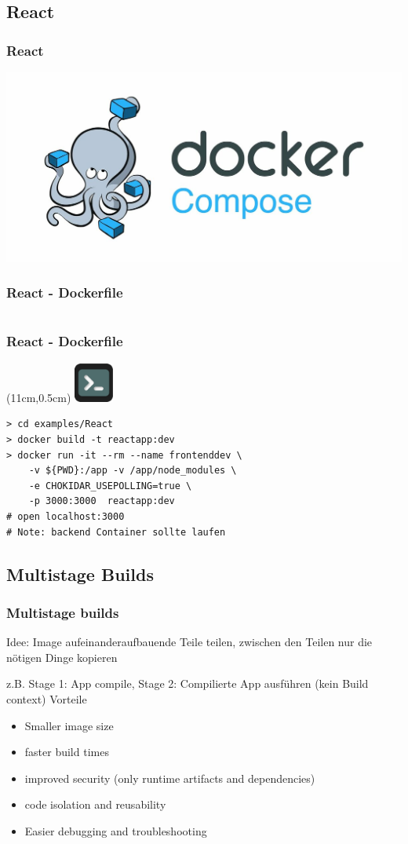 \documentclass[22pt]{beamer}
\newcommand{\terminal}{
    \begin{textblock*}{1.3cm}(11cm,0.5cm) %
    \includegraphics[width=1.3cm]{Bilder/terminal2.png}
    \end{textblock*}
}
\begin{document}
\subsection{React}
\begin{frame}[t]
    \frametitle{React}
    \includegraphics{Bilder/1200px-Docker-compose-logo.jpg}

\end{frame}

\begin{frame}[fragile]
    \frametitle{React - Dockerfile}
    \inputminted[fontsize=\footnotesize, frame=lines]{dockerfile}{../examples/React/Dockerfile}
\end{frame}

\begin{frame}[fragile]
    \frametitle{React - Dockerfile}
    \terminal
\begin{verbatim}
> cd examples/React
> docker build -t reactapp:dev
> docker run -it --rm --name frontenddev \
    -v ${PWD}:/app -v /app/node_modules \
    -e CHOKIDAR_USEPOLLING=true \
    -p 3000:3000  reactapp:dev
# open localhost:3000
# Note: backend Container sollte laufen
\end{verbatim}
\end{frame}

\subsection{Multistage Builds}
\begin{frame}[t]
    \frametitle{Multistage builds}
    Idee: Image aufeinanderaufbauende Teile teilen, zwischen den Teilen nur die nötigen Dinge kopieren

    z.B. Stage 1: App compile, Stage 2: Compilierte App ausführen (kein Build context) 
    Vorteile
    \begin{itemize}
        \item Smaller image size
        \item faster build times
        \item improved security (only runtime artifacts and dependencies)
        \item code isolation and reusability
        \item Easier debugging and troubleshooting
    \end{itemize} 
\end{frame}
\end{document}
